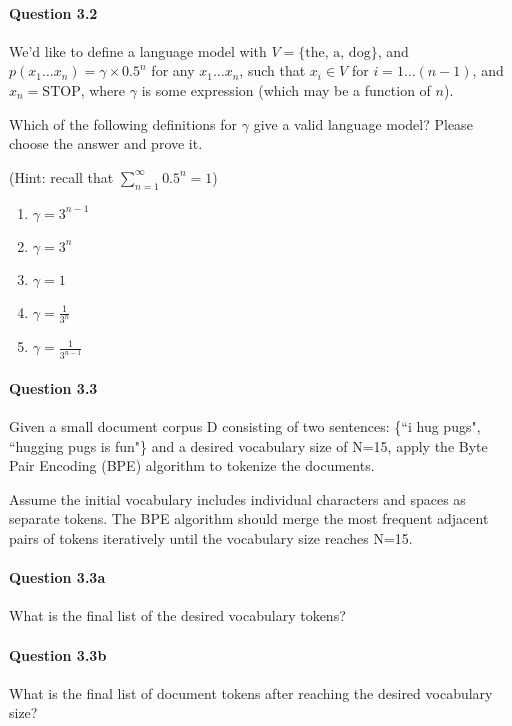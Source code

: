 \documentclass[10pt]{article}
\begin{document}
\newpage
\paragraph{Question 3.2}

We'd like to define a language model with \( V = \{\text{the, a, dog}\} \), and \( p(x_1 \ldots x_n) = \gamma \times 0.5^n \) for any \( x_1 \ldots x_n \), such that \( x_i \in V \) for \( i = 1 \ldots (n - 1) \), and \( x_n = \text{STOP} \), where \( \gamma \) is some expression (which may be a function of \( n \)).

Which of the following definitions for \( \gamma \) give a valid language model? Please choose the answer and prove it.

(Hint: recall that \( \sum_{n=1}^{\infty} 0.5^n = 1 \))

\begin{enumerate}
    \item \( \gamma = 3^{n-1} \)
    \item \( \gamma = 3^n \)
    \item \( \gamma = 1 \)
    \item \( \gamma = \frac{1}{3^n} \)
    \item \( \gamma = \frac{1}{3^{n-1}} \)
\end{enumerate}



\newpage
\paragraph{Question 3.3}
Given a small document corpus D consisting of two sentences: \{``i hug pugs", ``hugging pugs is fun"\} and a desired vocabulary size of N=15, apply the Byte Pair Encoding (BPE) algorithm to tokenize the documents.

Assume the initial vocabulary includes individual characters and spaces as separate tokens. The BPE algorithm should merge the most frequent adjacent pairs of tokens iteratively until the vocabulary size reaches N=15.

\paragraph{Question 3.3a} What is the final list of the desired vocabulary tokens?
\paragraph{Question 3.3b} What is the final list of document tokens after reaching the desired vocabulary size?
\end{document}
